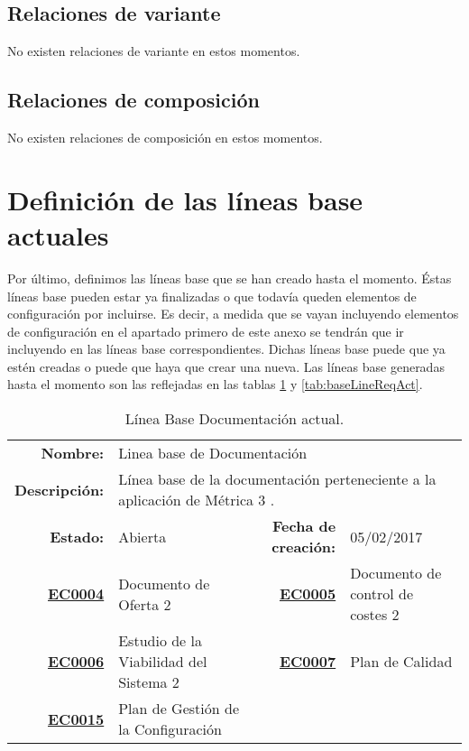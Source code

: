 \subsection{Relaciones de variante}
No existen relaciones de variante en estos momentos.

\subsection{Relaciones de composición}
No existen relaciones de composición en estos momentos.




\section{Definición de las líneas base actuales}
\par Por último, definimos las líneas base que se han creado hasta el momento. Éstas líneas base pueden estar ya finalizadas o que todavía queden elementos de configuración por
incluirse. Es decir, a medida que se vayan incluyendo elementos de configuración en el apartado primero de este anexo se tendrán que ir incluyendo en las líneas base correspondientes. Dichas líneas base puede que ya estén creadas o puede que haya que crear
una nueva. Las líneas base generadas hasta el momento son las reflejadas en las tablas \ref{tab:baseLineDocAct} y \ref{tab:baseLineReqAct}.

\begin{table}[h]
\begin{center}
\begin{tabular}{ r l | r l }
\hline
\textbf{Nombre:} & \multicolumn{3}{p{10cm}}{Linea base de Documentación} \\
\textbf{Descripción:} & \multicolumn{3}{p{10cm}}{Línea base de la documentación perteneciente a la aplicación de Métrica 3 \cite{WEB:Metrica3}.} \\ \hline \hline
\textbf{Estado:} & Abierta & \textbf{Fecha de creación:} & 05/02/2017 \\ \hline
\textbf{\hyperref[EC:0004]{EC0004}} & Documento de Oferta 2 & \textbf{\hyperref[EC:0005]{EC0005}} & Documento de control de costes 2 \\
\textbf{\hyperref[EC:0006]{EC0006}} & Estudio de la Viabilidad del Sistema 2 & \textbf{\hyperref[EC:0007]{EC0007}} & Plan de Calidad \\
\textbf{\hyperref[EC:0015]{EC0015}} & Plan de Gestión de la Configuración & \\
\hline
\end{tabular}
\caption{Línea Base Documentación actual.}
\label{tab:baseLineDocAct}
\end{center}
\end{table}



